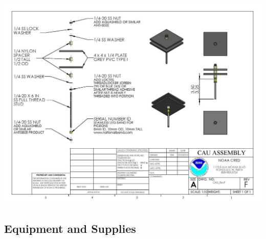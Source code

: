 \documentclass[]{book}
\begin{document}
\includegraphics{images/CAU_assembly.jpg}

\hypertarget{equipment-and-supplies}{%
\subsection{Equipment and Supplies}\label{equipment-and-supplies}}
\end{document}
